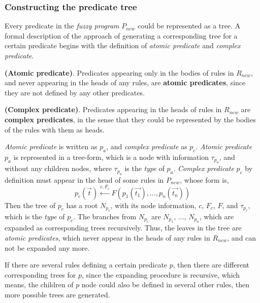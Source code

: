 \subsubsection{Constructing the predicate tree}
\label{sec:Construct}
Every predicate in the \textit{fuzzy program} $P_{new}$ could be represented as a tree. A formal description of the approach of generating a corresponding tree for a certain predicate begins with the definition of \textit{atomic predicate} and \textit{complex predicate}.
 
\begin{defin}\textbf{(Atomic predicate)}.
Predicates appearing only in the bodies of rules in $R_{new}$, and never appearing in the heads of any rules, are \textbf{atomic predicates}, since they are not defined by any other predicates.  
\end{defin}

\begin{defin}\textbf{(Complex predicate)}.
Predicates appearing in the heads of rules in $R_{new}$ are \textbf{complex predicates}, in the sense that they could be represented by the bodies of the rules with them as heads. 
\end{defin}

\textit{Atomic predicate} is written as $p_{a}$, and \textit{complex predicate} as $p_{c}$. \textit{Atomic predicate} $p_{a}$ is represented in a tree-form, which is a node with information $\tau_{p_{a}}$, and without any children nodes, where $\tau_{p_{a}}$ is the \textit{type} of $p_{a}$. \textit{Complex predicate} $p_{c}$ by definition must appear in the head of some rules in $P_{new}$, whose form is,
\[p_{c}(\vec{t}) \stackrel{c,F_c}{\longleftarrow}F(p_1(\vec{t_1}),...,p_n(\vec{t_n}))\] 
Then the tree of $p_{c}$ has a root $N_{p_{c}}$, with its node information, $c$, $F_c$, $F$, and $\tau_{p_{c}}$, which is the \textit{type} of $p_{c}$. The branches from $N_{p_{c}}$ are $N_{p_1}$, ..., $N_{p_n}$, which are expanded as corresponding trees recursively. Thus, the leaves in the tree are \textit{atomic predicates}, which never appear in the heads of any rules in $R_{new}$, and can not be expanded any more.

If there are several rules defining a certain predicate $p$, then there are different corresponding trees for $p$, since the expanding procedure is recursive, which means, the children of $p$ node could also be defined in several other rules, then more possible trees are generated. 




